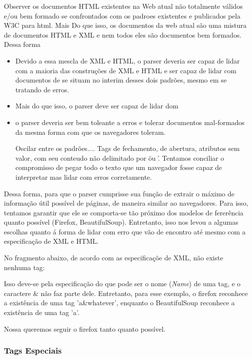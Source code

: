 \documentclass[10pt,twocolumn]{article}
\begin{document}
Observer os documentos HTML existentes na Web atual não totalmente válidos e/ou
bem formado se confrontados com os padroes existentes e publicados pela W3C
para html. Mais Do que isso, os documentos da web atual são uma mistura de
documentos HTML e XML e nem todos eles são documentos bem formados. Dessa forma

\begin{itemize}

\item Devido a essa mescla de XML e HTML, o parser deveria ser capaz de lidar
com a maioria das construções de XML e HTML e ser capaz de lidar com documentos
de se situam no interim desses dois padrões, mesmo em se tratando de erros.

\item Mais do que isso, o parser deve ser capaz de lidar dom

\item o parser deveria ser bem toleante a erros e tolerar documentos
mal-formados da mesma forma com que os navegadores toleram. 

Oscilar entre os padrões.... Tags de fechamento, de abertura, atributos sem
valor, com seu conteudo não delimitado por \" ou \'. Tentamos conciliar o
compromisso de pegar todo o texto que um navegador fosse capaz de interpretar
mas lidar com erros corretamente.

\end{itemize}

Dessa forma, para que o parser cumprisse sua função de extrair o máximo de
informação útil possível de páginas, de maneira similar ao navegadores. Para
isso, tentamos garantir que ele se comporta-se tão próximo dos modelos de
fererência quanto possível (Firefox, BeautifulSoup). Entretanto, isso nos levou
a algumas escolhas quanto á forma de lidar com erro que vão de encontro até
mesmo com a especificação de XML e HTML.

No fragmento abaixo, de acordo com as especificaçõe de XML, não existe nenhuma tag:

Isso deve-se pela especificação do que pode ser o nome (\emph{Name}) de uma
tag, e o caractere \& não faz parte dele. Entretanto, para esse exemplo, o
firefox reconhece a existência de uma tag 'a\&whatever', enquanto o
BeautifulSoup reconhece a existência de uma tag 'a'.

Nossa queremos seguir o firefox tanto quanto possível.

\subsubsection{Tags Especiais}
\end{document}
